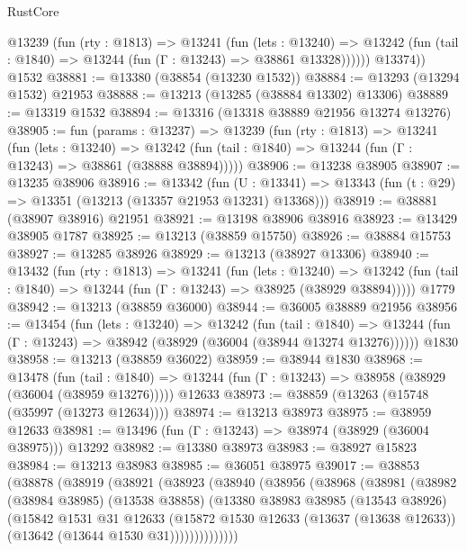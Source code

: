 \begin{lexlean}{RustCore}
\begin{coremodule}
          @13239
            (fun (rty : @1813) =>
            @13241
              (fun (lets : @13240) =>
              @13242 (fun (tail : @1840) => @13244 (fun (Γ : @13243) => @38861 @13328))))))
        @13374))
    @1532
@38881 := @13380 (@38854 (@13230 @1532))
@38884 := @13293 (@13294 @1532) @21953
@38888 := @13213 (@13285 (@38884 @13302) @13306)
@38889 := @13319 @1532
@38894 := @13316 (@13318 @38889 @21956 @13274 @13276)
@38905 := fun (params : @13237) =>
  @13239
    (fun (rty : @1813) =>
    @13241
      (fun (lets : @13240) =>
      @13242 (fun (tail : @1840) => @13244 (fun (Γ : @13243) => @38861 (@38888 @38894)))))
@38906 := @13238 @38905
@38907 := @13235 @38906
@38916 := @13342
    (fun (U : @13341) => @13343 (fun (t : @29) => @13351 (@13213 (@13357 @21953 @13231) @13368)))
@38919 := @38881 (@38907 @38916) @21951
@38921 := @13198 @38906 @38916
@38923 := @13429 @38905 @1787
@38925 := @13213 (@38859 @15750)
@38926 := @38884 @15753
@38927 := @13285 @38926
@38929 := @13213 (@38927 @13306)
@38940 := @13432
    (fun (rty : @1813) =>
    @13241
      (fun (lets : @13240) =>
      @13242 (fun (tail : @1840) => @13244 (fun (Γ : @13243) => @38925 (@38929 @38894)))))
    @1779
@38942 := @13213 (@38859 @36000)
@38944 := @36005 @38889 @21956
@38956 := @13454
    (fun (lets : @13240) =>
    @13242
      (fun (tail : @1840) =>
      @13244 (fun (Γ : @13243) => @38942 (@38929 (@36004 (@38944 @13274 @13276))))))
    @1830
@38958 := @13213 (@38859 @36022)
@38959 := @38944 @1830
@38968 := @13478
    (fun (tail : @1840) => @13244 (fun (Γ : @13243) => @38958 (@38929 (@36004 (@38959 @13276)))))
    @12633
@38973 := @38859 (@13263 (@15748 (@35997 (@13273 @12634))))
@38974 := @13213 @38973
@38975 := @38959 @12633
@38981 := @13496 (fun (Γ : @13243) => @38974 (@38929 (@36004 @38975))) @13292
@38982 := @13380 @38973
@38983 := @38927 @15823
@38984 := @13213 @38983
@38985 := @36051 @38975
@39017 := @38853
    (@38878
      (@38919
        (@38921
          (@38923
            (@38940
              (@38956
                (@38968
                  (@38981
                    (@38982
                      (@38984 @38985)
                      (@13538 @38858)
                      (@13380
                        @38983
                        @38985
                        (@13543 @38926)
                        (@15842
                          @1531
                          @31
                          @12633
                          (@15872
                            @1530
                            @12633
                            (@13637 (@13638 @12633))
                            (@13642 (@13644 @1530 @31))))))))))))))

\end{coremodule}
\end{lexlean}
